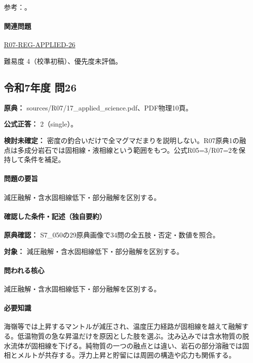 \par 参考：\cite{vol50_melt_ref,vol50_subduction_ref}。

\paragraph{関連問題} \hyperref[q:r07-reg-applied-26]{R07-REG-APPLIED-26}

\par 難易度 4（校準初稿）、優先度未評価。

\subsection{令和7年度 問26}
\label{q:r07-reg-applied-26}

\noindent\textbf{原典：} sources/R07/17\_applied\_science.pdf、PDF物理10頁。

\textbf{公式正答：} 2（single）。

\par\textbf{検討未確定：} 密度の釣合いだけで全マグマだまりを説明しない。R07原典1の融点は多成分岩石では固相線・液相線という範囲をもつ。公式R05=\allowbreak{}3/R07=\allowbreak{}2を保持して条件を補足。

\paragraph{問題の要旨} 減圧融解・含水固相線低下・部分融解を区別する。

\paragraph{確認した条件・記述（独自要約）}\mbox{}\par

\noindent\textbf{原典確認：} S7\_050の29原典画像で34問の全五肢・否定・数値を照合。\par

\noindent\textbf{対象：} 減圧融解・含水固相線低下・部分融解を区別する。\par

\paragraph{問われる核心} 減圧融解・含水固相線低下・部分融解を区別する。

\paragraph{必要知識} 海嶺等では上昇するマントルが減圧され、温度圧力経路が固相線を越えて融解する。低温物質の急な昇温だけを原因とした肢を選ぶ。沈み込みでは含水物質の脱水流体が固相線を下げる。純物質の一つの融点とは違い、岩石の部分溶融では固相とメルトが共存する。浮力上昇と貯留には周囲の構造や応力も関係する。

